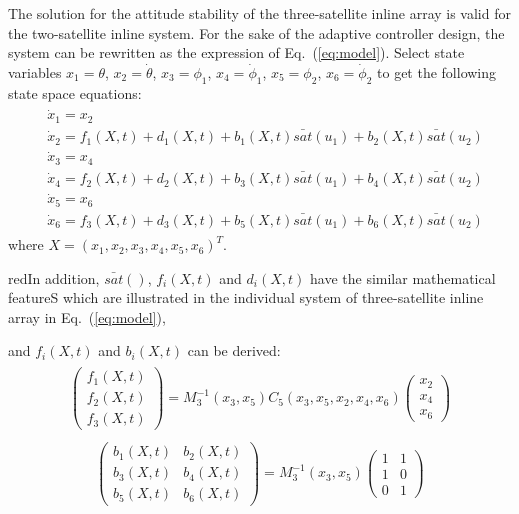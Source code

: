The solution for the attitude stability of the three-satellite inline array is valid for the two-satellite inline system. For the sake of the adaptive controller design, the system can be rewritten as the expression of Eq.~(\ref{eq:model}). Select state variables $x_1=\theta$, $x_2=\dot\theta$, $x_3=\phi_1$, $x_4=\dot\phi_1$, $x_5=\phi_2$, $x_6=\dot\phi_2$ to get the following state space equations:
\begin{align}
\begin{split}
&\dot x_1 = x_2\\
&\dot x_2 = f_1(X,t)+d_1(X,t)+b_1(X,t)\bar{sat}(u_1)+b_2(X,t)\bar{sat}(u_2)\\
&\dot x_3 = x_4\\
&\dot x_4 = f_2(X,t)+d_2(X,t)+b_3(X,t)\bar{sat}(u_1)+b_4(X,t)\bar{sat}(u_2)\\
&\dot x_5 = x_6\\
&\dot x_6 = f_3(X,t)+d_3(X,t)+b_5(X,t)\bar{sat}(u_1)+b_6(X,t)\bar{sat}(u_2)
\end{split}\label{eq:2model}
\end{align}
where $X = (x_1,x_2,x_3,x_4,x_5,x_6)^T$. \begin{color}{red}In addition, $\bar{sat}()$, $f_i(X,t)$ and $d_i(X,t)$ have the similar mathematical featureS which are illustrated in the individual system of three-satellite inline array in Eq.~(\ref{eq:model}),\end{color} and $f_i(X,t)$ and $b_i(X,t)$ can be derived:
\begin{align}
\begin{split}
\begin{pmatrix}
f_1(X,t)\\
f_2(X,t)\\
f_3(X,t)
\end{pmatrix}=
M_3^{-1}(x_3,x_5)C_5(x_3,x_5,x_2,x_4,x_6)
\begin{pmatrix}
x_2\\
x_4\\
x_6
\end{pmatrix}
\end{split}
\end{align}
\begin{align}
\begin{split}
\begin{pmatrix}
b_1(X,t)&b_2(X,t)\\
b_3(X,t)&b_4(X,t)\\
b_5(X,t)&b_6(X,t)
\end{pmatrix}=
M_3^{-1}(x_3,x_5)
\begin{pmatrix}
1 &1\\
1 &0\\
0 &1
\end{pmatrix}
\end{split}
\end{align}
